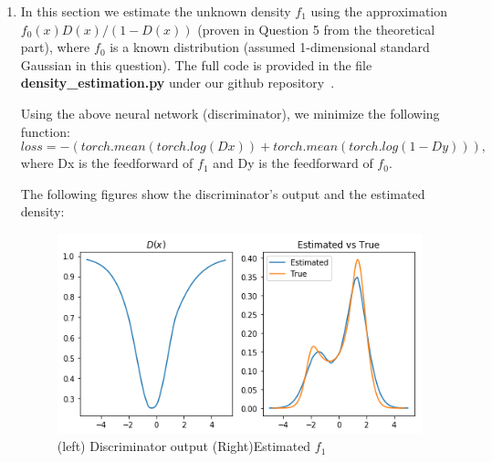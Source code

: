 \begin{enumerate}
\item In this section we estimate the unknown density $f_1$ using the approximation ${f_0(x){D(x)}/(1-D(x))}$ (proven in Question 5 from the theoretical part), where $f_0$ is a known distribution (assumed 1-dimensional standard Gaussian in this question). The full code is provided in the file \textbf{density\_estimation.py} under our github repository~\cite{github}.

Using the above neural network (discriminator), we minimize the following function:
$$loss = -(torch.mean(torch.log(Dx)) + torch.mean(torch.log(1-Dy))),$$
where Dx is the feedforward of $f_1$ and Dy is the feedforward of $f_0$. 

The following figures show the discriminator's output and the estimated density:

\begin{figure}[H]
	\centering
	\includegraphics[scale=0.8]{disc.png}
	\caption{(left) Discriminator output (Right)Estimated $f_1$}
	\label{fig:disc}
\end{figure}



\end{enumerate}

